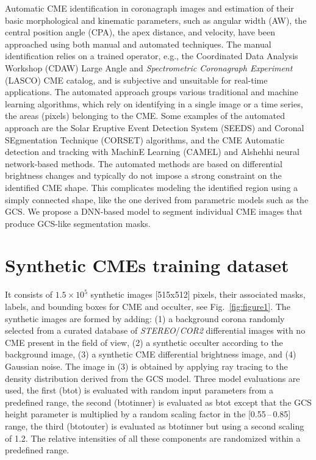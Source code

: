 \documentclass[baaa]{baaa}
\begin{document}
Automatic CME identification in coronagraph images and estimation of their basic morphological and kinematic parameters, such as angular width (AW), the central position angle (CPA), the apex distance, and velocity, have been approached using both manual and automated techniques. The manual identification relies on a trained operator, e.g., the Coordinated Data Analysis Workshop (CDAW) Large Angle and \textit{Spectrometric Coronagraph Experiment} (LASCO)
CME catalog, and is subjective and unsuitable for real-time applications. The automated approach groups various traditional and machine learning algorithms, which rely on identifying in a single image or a time series, the areas (pixels) belonging to the CME. Some examples of the automated approach are the Solar Eruptive Event Detection System (SEEDS) \citep{Olmedo-etal2008} and  Coronal SEgmentation Technique (CORSET) \citep{goussies2010} algorithms, and the CME Automatic detection and tracking with MachinE Learning (CAMEL)\citep{Wang2019} and Alshehhi\citep{Alshehhi2021} neural network-based methods. The automated methods are based on differential brightness changes and typically do not impose a strong constraint on the identified CME shape. This complicates modeling the identified region using a simply connected shape, like the one derived from parametric models such as the GCS. We propose a DNN-based model to segment individual CME images that produce GCS-like segmentation masks.

\section{Synthetic CMEs training dataset}
It consists of $1.5\times10^5$ synthetic images [515x512] pixels, their associated masks, labels, and bounding boxes for CME and occulter, see Fig.~\ref{fig:figure1}. The synthetic images are formed by adding: (1) a background corona randomly selected from a curated database of \textsl{STEREO}/\textsl{COR2} differential images with no CME present in the field of view, (2) a synthetic occulter according to the background image, (3) a synthetic CME differential brightness image, and (4) Gaussian noise. The image in (3) is obtained by applying ray tracing to the density distribution derived from the GCS model. Three model evaluations are used, the first (btot) is evaluated with random input parameters from a predefined range, the second (btot\textunderscore inner) is evaluated as btot except that the GCS height parameter is multiplied by a random scaling factor in the [0.55\,--\,0.85] range, the third (btot\textunderscore outer) is evaluated as btot\textunderscore inner but using a second scaling of 1.2. The relative intensities of all these components are randomized within a predefined range.
\end{document}
